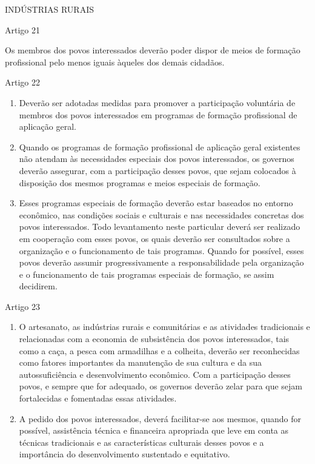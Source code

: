 \documentclass[
]{book}
\begin{document}
INDÚSTRIAS RURAIS

Artigo 21

Os membros dos povos interessados deverão poder dispor de meios de formação profissional pelo menos iguais àqueles dos demais cidadãos.

Artigo 22

\begin{enumerate}
\def\labelenumi{\arabic{enumi}.}
\item
  Deverão ser adotadas medidas para promover a participação voluntária de membros dos povos interessados em programas de formação profissional de aplicação geral.
\item
  Quando os programas de formação profissional de aplicação geral existentes não atendam às necessidades especiais dos povos interessados, os governos deverão assegurar, com a participação desses povos, que sejam colocados à disposição dos mesmos programas e meios especiais de formação.
\item
  Esses programas especiais de formação deverão estar baseados no entorno econômico, nas condições sociais e culturais e nas necessidades concretas dos povos interessados. Todo levantamento neste particular deverá ser realizado em cooperação com esses povos, os quais deverão ser consultados sobre a organização e o funcionamento de tais programas. Quando for possível, esses povos deverão assumir progressivamente a responsabilidade pela organização e o funcionamento de tais programas especiais de formação, se assim decidirem.
\end{enumerate}

Artigo 23

\begin{enumerate}
\def\labelenumi{\arabic{enumi}.}
\item
  O artesanato, as indústrias rurais e comunitárias e as atividades tradicionais e relacionadas com a economia de subsistência dos povos interessados, tais como a caça, a pesca com armadilhas e a colheita, deverão ser reconhecidas como fatores importantes da manutenção de sua cultura e da sua autossuficiência e desenvolvimento econômico. Com a participação desses povos, e sempre que for adequado, os governos deverão zelar para que sejam fortalecidas e fomentadas essas atividades.
\item
  A pedido dos povos interessados, deverá facilitar-se aos mesmos, quando for possível, assistência técnica e financeira apropriada que leve em conta as técnicas tradicionais e as características culturais desses povos e a importância do desenvolvimento sustentado e equitativo.
\end{enumerate}
\end{document}
